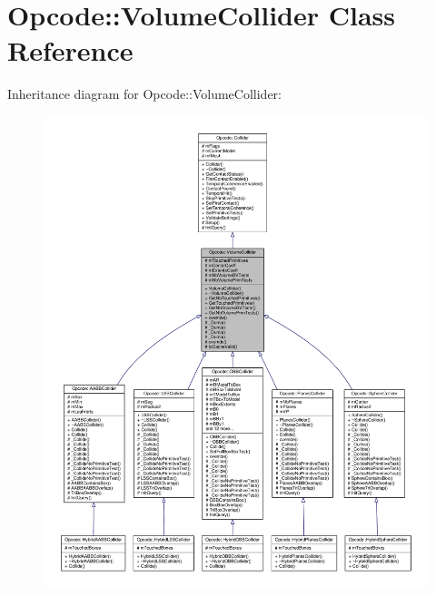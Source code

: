 \hypertarget{classOpcode_1_1VolumeCollider}{}\section{Opcode\+:\+:Volume\+Collider Class Reference}
\label{classOpcode_1_1VolumeCollider}


Inheritance diagram for Opcode\+:\+:Volume\+Collider\+:
\nopagebreak
\begin{figure}[H]
\begin{center}
\leavevmode
\includegraphics[width=350pt]{d1/da4/classOpcode_1_1VolumeCollider__inherit__graph}
\end{center}
\end{figure}


